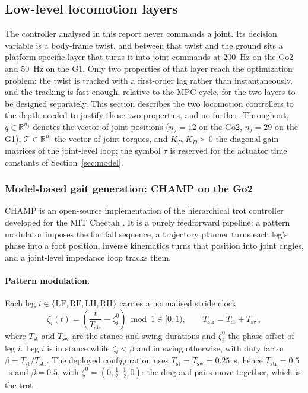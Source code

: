 \documentclass[11pt,a4paper]{article}
\newcommand{\R}{\mathbb{R}}
\newcommand{\Tstr}{T_{\mathrm{str}}}
\newcommand{\Tst}{T_{\mathrm{st}}}
\newcommand{\Tsw}{T_{\mathrm{sw}}}
\begin{document}
\subsection{Low-level locomotion layers}
\label{sec:lowlevel}

The controller analysed in this report never commands a joint. Its decision variable is a body-frame twist,
and between that twist and the ground sits a platform-specific layer that turns it into joint commands at
$200$~Hz on the Go2 and $50$~Hz on the G1. Only two properties of that layer reach the optimization problem:
the twist is tracked with a first-order lag rather than instantaneously, and the tracking is fast enough,
relative to the MPC cycle, for the two layers to be designed separately. This section describes the two
locomotion controllers to the depth needed to justify those two properties, and no further. Throughout,
$q\in\R^{n_j}$ denotes the vector of joint positions ($n_j=12$ on the Go2, $n_j=29$ on the G1),
$\mathcal{T}\in\R^{n_j}$ the vector of joint torques, and $K_P,K_D\succ0$ the diagonal gain matrices of the
joint-level loop; the symbol $\tau$ is reserved for the actuator time constants of Section~\ref{sec:model}.

\subsubsection{Model-based gait generation: CHAMP on the Go2}
\label{sec:champ}

CHAMP \cite{champ} is an open-source implementation of the hierarchical trot controller developed for the MIT
Cheetah \cite{lee2013hierarchical}. It is a purely feedforward pipeline: a pattern modulator imposes the
footfall sequence, a trajectory planner turns each leg's phase into a foot position, inverse kinematics turns
that position into joint angles, and a joint-level impedance loop tracks them.

\paragraph{Pattern modulation.} Each leg $i\in\{\mathrm{LF},\mathrm{RF},\mathrm{LH},\mathrm{RH}\}$ carries a
normalised stride clock
\begin{equation}
  \zeta_i(t)=\left(\frac{t}{\Tstr}-\zeta_i^{0}\right)\bmod 1\in[0,1),
  \qquad \Tstr=\Tst+\Tsw ,
  \label{eq:gaitphase}
\end{equation}
where $\Tst$ and $\Tsw$ are the stance and swing durations and $\zeta_i^{0}$ the phase offset of leg $i$. Leg
$i$ is in stance while $\zeta_i<\beta$ and in swing otherwise, with duty factor $\beta=\Tst/\Tstr$. The
deployed configuration uses $\Tst=\Tsw=0.25$~s, hence $\Tstr=0.5$~s and $\beta=0.5$, with
$\zeta^{0}=(0,\tfrac12,\tfrac12,0)$: the diagonal pairs move together, which is the trot.
\end{document}

